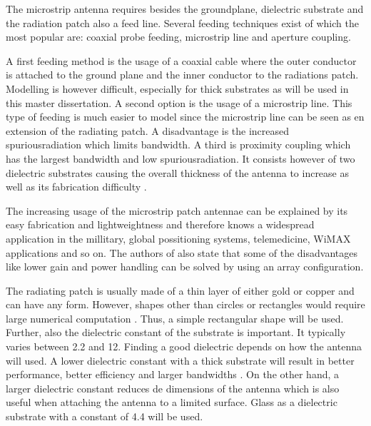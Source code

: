 The microstrip antenna requires besides the groundplane, dielectric substrate and the radiation patch also a feed line. Several feeding techniques exist of which the most popular are: coaxial probe feeding, microstrip line and aperture coupling. %

A first feeding method is the usage of a coaxial cable where the outer conductor is attached to the ground plane and the inner conductor to the radiations patch. Modelling is however difficult, especially for thick substrates as will be used in this master dissertation.
A second option is the usage of a microstrip line. This type of feeding is much easier to model since the microstrip line can be seen as en extension of the radiating patch.
A disadvantage is the increased \gls{spuriousradiation} which limits bandwidth.
A third is proximity coupling which has the largest bandwidth and low \gls{spuriousradiation}. It consists however of two dielectric substrates causing the overall thickness
of the antenna to increase as well as its fabrication difficulty \cite{J13_microstripadvantages}.

The increasing usage of the microstrip patch antennae can be explained by its easy fabrication and lightweightness 
and therefore knows a widespread application in the millitary, global possitioning systems, telemedicine, 
WiMAX applications and so on.
The authors of \cite{J13_microstripadvantages} also state that some of the disadvantages like lower gain and power 
handling can be solved by using an array configuration.

The radiating patch is usually made of a thin layer of either gold or copper \cite{J14_antennadesign,J15_antennadesign}
and can have any form. However, shapes other than circles or rectangles would require large numerical computation \cite{J14_antennadesign}.
Thus, a simple rectangular shape will be used.
Further, also the \gls{dielectric constant} of the substrate is important. It typically varies between 2.2 and 12.
Finding a good dielectric depends on how the antenna will used. A lower
\gls{dielectric constant} with a thick substrate will result in better performance, better efficiency and larger bandwidths  \cite{J15_antennadesign}.
On the other hand, a larger \gls{dielectric constant} reduces de dimensions of the antenna \cite{J14_antennadesign}
which is also useful when attaching the 
antenna to a limited surface. Glass as a dielectric substrate with a constant of 4.4 will be used.